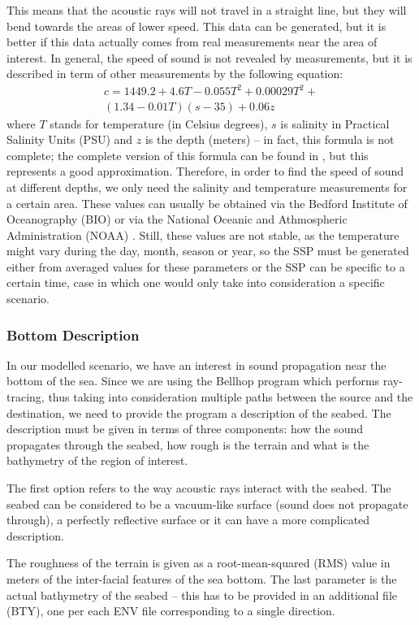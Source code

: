 \documentclass[a4paper]{IEEEtran}
\begin{document}
This means that the acoustic rays will not travel in a straight line, but they
will bend towards the areas of lower speed. This data can be generated, but it
is better if this data actually comes from real measurements near the
area of interest. In general, the speed of sound is not revealed by
measurements, but it is described in term of other measurements by the
following equation: 
\begin{eqnarray*}
 c = 1449.2 + 4.6 T - 0.055 T^2 + 0.00029 T^2 +\\
(1.34 - 0.01 T)(s - 35) + 0.06z
\end{eqnarray*}
where $T$ stands for temperature (in Celsius degrees), $s$ is salinity
in Practical Salinity Units (PSU) and $z$ is the depth (meters) -- in
fact, this formula is not complete; the complete version of this
formula can be found in \cite{ssp}, but this represents a good
approximation. 
Therefore, in order to find the speed of sound at different depths, we
only need the salinity and temperature measurements for a certain
area. These values can usually be obtained via the Bedford Institute
of Oceanography (BIO) \cite{bio} or via the National Oceanic and
Athmospheric Administration (NOAA) \cite{noaa}. Still, these values
are not stable, as the temperature might vary during the day, month, season or
year, so the SSP must be generated either from averaged values for these
parameters or the SSP can be specific to a certain time, case in which
one would only take into consideration a specific scenario.

\subsubsection{Bottom Description}
In our modelled scenario, we have an interest in sound propagation
near the bottom of the sea. Since we are using the Bellhop program
which performs ray-tracing, thus taking into consideration multiple
paths between the source and the destination, we need to provide the
program a description of the seabed. The description must be given in
terms of three components: how the sound propagates through the
seabed, how rough is the terrain and what is the bathymetry of the
region of interest.

The first option refers to the way acoustic rays interact with the
seabed. The seabed can be considered to be a vacuum-like surface
(sound does not propagate through), a perfectly reflective surface or
it can have a more complicated description.

The roughness of the terrain is given as a root-mean-squared (RMS)
value in meters of the inter-facial features of the sea bottom. The
last parameter is the actual bathymetry of the seabed -- this has to
be provided in an additional file (BTY), one per each ENV file
corresponding to a single direction.
\end{document}
